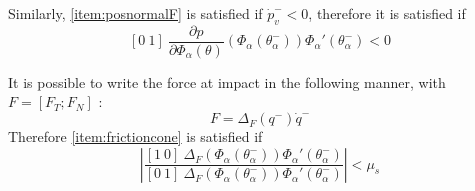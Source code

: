 Similarly, \ref{item:posnormalF} is satisfied if $\dot{p}_v^- < 0$, therefore it is satisfied if
\begin{equation} \label{eqn:posnormalF}
	[0~1]~\frac{\partial p}{\partial\Phi_\alpha(\theta)}
	\left(\Phi_\alpha\left(\theta_\alpha^-\right)\right)\Phi_\alpha'\left(\theta_\alpha^-\right)<0
\end{equation}

It is possible to write the force at impact in the following manner, with $F = [F_T;F_N]$ \cite{westervelt2007feedback}:
\[ F = \Delta_{F}(q^-)\dot{q}^- \]
Therefore \ref{item:frictioncone} is satisfied if 
\begin{equation}
	\left\lvert\frac{[1~0]~\Delta_F(\Phi_\alpha\left(\theta_\alpha^-\right)) \Phi_\alpha'\left(\theta_\alpha^-\right)}
		{[0~1]~\Delta_F(\Phi_\alpha\left(\theta_\alpha^-\right)) \Phi_\alpha'\left(\theta_\alpha^-\right)}\right\rvert
		< \mu_s
\end{equation}